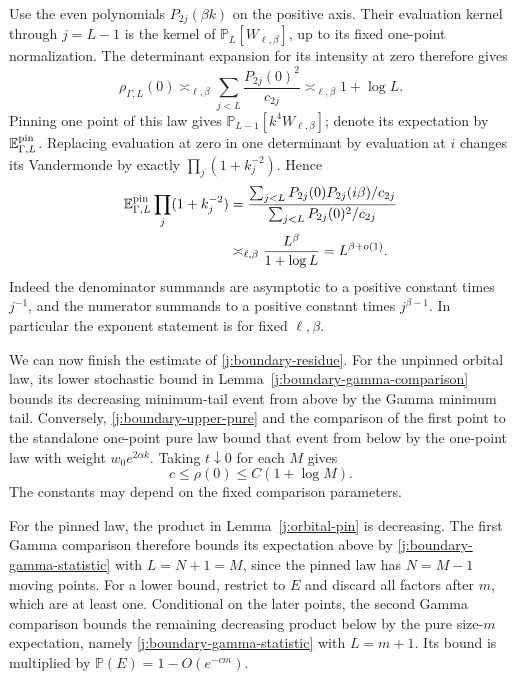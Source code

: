 Use the even polynomials $P_{2j}(\beta k)$ on the positive axis.
Their evaluation kernel through $j=L-1$ is the kernel of
$\mathbb P_L[W_{\ell,\beta}]$, up to its fixed one-point normalization.
The determinant expansion for its intensity at zero therefore gives
\[
 \rho_{\Gamma,L}(0)\asymp_{\ell,\beta}
 \sum_{j<L}\frac{P_{2j}(0)^2}{c_{2j}}
 \asymp_{\ell,\beta}1+\log L.
\]
Pinning one point of this law gives
$\mathbb P_{L-1}[k^4W_{\ell,\beta}]$; denote its expectation by
$\mathbb E_{\Gamma,L}^{\rm pin}$. Replacing evaluation at zero in
one determinant by evaluation at $i$ changes its Vandermonde by exactly
$\prod_j(1+k_j^{-2})$. Hence
\begin{equation}\label{j:boundary-gamma-statistic}
 \begin{split}
 \mathbb E_{\Gamma,L}^{\rm pin}\prod_j(1+k_j^{-2})
 &=\frac{\sum_{j<L}P_{2j}(0)P_{2j}(i\beta)/c_{2j}}
         {\sum_{j<L}P_{2j}(0)^2/c_{2j}}\\
 &\asymp_{\ell,\beta}\frac{L^\beta}{1+\log L}
 =L^{\beta+o(1)}.
 \end{split}
\end{equation}
Indeed the denominator summands are asymptotic to a positive constant
times $j^{-1}$, and the numerator summands to a positive constant times
$j^{\beta-1}$. In particular the exponent statement is for fixed
$\ell,\beta$.

We can now finish the estimate of \eqref{j:boundary-residue}.
For the unpinned orbital law, its lower stochastic bound in
Lemma~\ref{j:boundary-gamma-comparison} bounds its decreasing
minimum-tail event from above by the Gamma minimum tail. Conversely,
\eqref{j:boundary-upper-pure} and the comparison of the first point to
the standalone one-point pure law bound that event from below by the
one-point law with weight $w_0e^{2\alpha k}$. Taking $t\downarrow0$ for
each $M$ gives
\[
 c\le\rho(0)\le C(1+\log M).
\]
The constants may depend on the fixed comparison parameters.

For the pinned law, the product in Lemma~\ref{j:orbital-pin} is
decreasing. The first Gamma comparison therefore bounds its expectation
above by \eqref{j:boundary-gamma-statistic} with $L=N+1=M$, since the
pinned law has $N=M-1$ moving points. For a lower
bound, restrict to $E$ and discard all factors after $m$, which are at
least one. Conditional on the later points, the second Gamma comparison
bounds the remaining decreasing product below by the pure size-$m$
expectation, namely \eqref{j:boundary-gamma-statistic} with $L=m+1$.
Its bound is multiplied by $\mathbb P(E)=1-O(e^{-cm})$.

